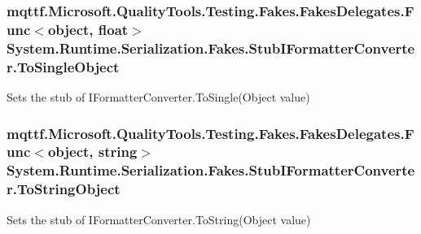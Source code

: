 \hypertarget{class_system_1_1_runtime_1_1_serialization_1_1_fakes_1_1_stub_i_formatter_converter_a264f4db22277fe6a85e6b5e863112027}{
\subsubsection[{To\-Single\-Object}]{\setlength{\rightskip}{0pt plus 5cm}mqttf.\-Microsoft.\-Quality\-Tools.\-Testing.\-Fakes.\-Fakes\-Delegates.\-Func$<$object, float$>$ System.\-Runtime.\-Serialization.\-Fakes.\-Stub\-I\-Formatter\-Converter.\-To\-Single\-Object}}\label{class_system_1_1_runtime_1_1_serialization_1_1_fakes_1_1_stub_i_formatter_converter_a264f4db22277fe6a85e6b5e863112027}


Sets the stub of I\-Formatter\-Converter.\-To\-Single(\-Object value)

\hypertarget{class_system_1_1_runtime_1_1_serialization_1_1_fakes_1_1_stub_i_formatter_converter_a85bf7abd70c85db8570a838e69902bb5}{
\subsubsection[{To\-String\-Object}]{\setlength{\rightskip}{0pt plus 5cm}mqttf.\-Microsoft.\-Quality\-Tools.\-Testing.\-Fakes.\-Fakes\-Delegates.\-Func$<$object, string$>$ System.\-Runtime.\-Serialization.\-Fakes.\-Stub\-I\-Formatter\-Converter.\-To\-String\-Object}}\label{class_system_1_1_runtime_1_1_serialization_1_1_fakes_1_1_stub_i_formatter_converter_a85bf7abd70c85db8570a838e69902bb5}


Sets the stub of I\-Formatter\-Converter.\-To\-String(\-Object value)

